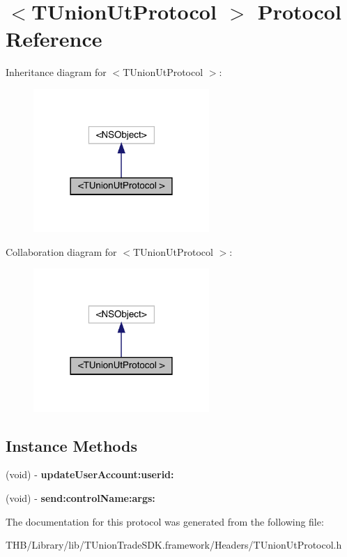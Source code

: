 \hypertarget{protocol_t_union_ut_protocol_01-p}{}\section{$<$T\+Union\+Ut\+Protocol $>$ Protocol Reference}
\label{protocol_t_union_ut_protocol_01-p}


Inheritance diagram for $<$T\+Union\+Ut\+Protocol $>$\+:\nopagebreak
\begin{figure}[H]
\begin{center}
\leavevmode
\includegraphics[width=189pt]{protocol_t_union_ut_protocol_01-p__inherit__graph}
\end{center}
\end{figure}


Collaboration diagram for $<$T\+Union\+Ut\+Protocol $>$\+:\nopagebreak
\begin{figure}[H]
\begin{center}
\leavevmode
\includegraphics[width=189pt]{protocol_t_union_ut_protocol_01-p__coll__graph}
\end{center}
\end{figure}
\subsection*{Instance Methods}
\begin{DoxyCompactItemize}
\item 
\mbox{\label{protocol_t_union_ut_protocol_01-p_a1fbf36ba400824ca83d5d4b4bc898c74}} 
(void) -\/ {\bfseries update\+User\+Account\+:userid\+:}
\item 
\mbox{\label{protocol_t_union_ut_protocol_01-p_af8e40db9caa663fec430d2eaa50d25ad}} 
(void) -\/ {\bfseries send\+:control\+Name\+:args\+:}
\end{DoxyCompactItemize}


The documentation for this protocol was generated from the following file\+:\begin{DoxyCompactItemize}
\item 
T\+H\+B/\+Library/lib/\+T\+Union\+Trade\+S\+D\+K.\+framework/\+Headers/T\+Union\+Ut\+Protocol.\+h\end{DoxyCompactItemize}
